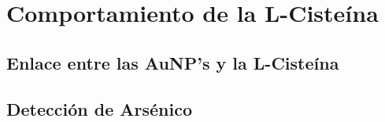 \section{Comportamiento de la L-Cisteína}

\subsection{Enlace entre las AuNP's y la L-Cisteína}

\subsection{Detección de Arsénico}
